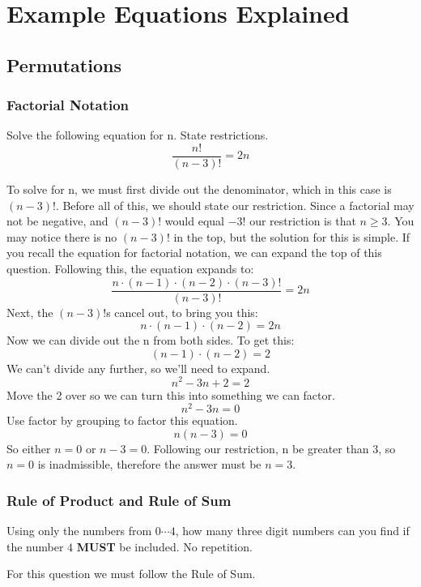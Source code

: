 \section{Example Equations Explained}

    \subsection{Permutations}
        \subsubsection{Factorial Notation}
            \begin{example}
            Solve the following equation for n. State restrictions.
            \[\frac{n!}{(n-3)!}=2n\]
            \end{example}
            To solve for n, we must first divide out the denominator, which in this case is $(n-3)!$. Before all of this, we should state our restriction. Since a factorial may not be negative, and $(n-3)!$ would equal $-3!$ our restriction is that \emph{$n\geqslant3$}. You may notice there is no $(n-3)!$ in the top, but the solution for this is simple. If you recall the equation for factorial notation, we can expand the top of this question.  Following this, the equation expands to:
            \[\frac{n\cdot(n-1)\cdot(n-2)\cdot(n-3)!}{(n-3)!}=2n\]
            Next, the $(n-3)!$s cancel out, to bring you this:
            \[n\cdot(n-1)\cdot(n-2) = 2n\]
            Now we can divide out the n from both sides. To get this:
            \[(n-1)\cdot(n-2) = 2\]
            We can't divide any further, so we'll need to expand.
            \[n^2 -3n+2 = 2\]
            Move the 2 over so we can turn this into something we can factor.
            \[n^2 -3n=0\]
            Use factor by grouping to factor this equation.
            \[n(n-3)=0\]
            So either $n=0$ or $n-3=0$. Following our restriction, n be greater than 3, so $n=0$ is inadmissible, therefore the answer must be $n=3$.
    \clearpage
        \subsubsection{Rule of Product and Rule of Sum}
            \begin{example}
            Using only the numbers from $0\cdots4$, how many three digit numbers can you find if the number $4$ \textbf{MUST} be included. No repetition.
            \end{example}
            For this question we must follow the Rule of Sum.
            
